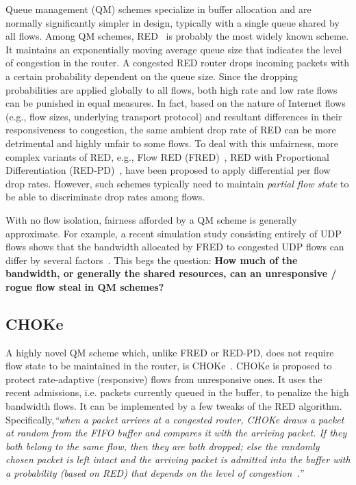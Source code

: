 \documentclass{IEEEtran}
\begin{document}
Queue management (QM) schemes specialize in buffer allocation and are normally significantly simpler in design, typically with a single queue shared by all flows. Among QM schemes, RED~\cite{REDfloyd93,adaptiveRED2001} is probably the most widely known scheme. It maintains an exponentially moving average queue size that indicates the level of congestion in the router. A congested RED router drops incoming packets with a certain probability dependent on the queue size. Since the dropping probabilities are applied globally to all flows, both high rate and low rate flows can be punished in equal measures. In fact, based on the nature of Internet flows (e.g., flow sizes, underlying transport protocol) and resultant differences in their responsiveness to congestion, the same ambient drop rate of RED can be more detrimental and highly unfair to some flows. To deal with this unfairness, more complex variants of RED, e.g.,  Flow RED (FRED)~\cite{fred97}, RED with Proportional Differentiation (RED-PD)~\cite{ratulICNP01}, have been proposed to apply differential per flow drop rates. However, such schemes typically need to maintain \emph{partial flow state} to be able to discriminate drop rates among flows.


With no flow isolation, fairness afforded by a QM scheme is generally approximate. For example, a recent simulation study consisting entirely of UDP flows shows that the bandwidth allocated by FRED to congested UDP flows can differ by several factors~\cite[see Fig.~6]{esheteAFpFT11}. This begs the question: \textbf{How much of the bandwidth, or generally the shared resources, can an unresponsive / rogue flow steal in QM schemes?}


\subsection{CHOKe}\label{subsec:introChoke}

A highly novel QM scheme which, unlike FRED or RED-PD, does not require flow state to be maintained in the router, is CHOKe~\cite{chokeInfocom00}. CHOKe is proposed to protect rate-adaptive (responsive) flows from unresponsive ones. It uses the recent admissions, i.e. packets currently queued in the buffer, to penalize the high bandwidth flows. It can be implemented by a few tweaks of the RED algorithm. Specifically,\emph{``when a packet arrives at a congested router, CHOKe draws a packet at random from the FIFO buffer and compares it with the arriving packet. If they both belong to the same flow, then they are both dropped; else the randomly chosen packet is left intact and the arriving packet is admitted into the buffer with a probability (based on RED) that depends on the level of congestion~\cite{chokeInfocom00}.''}
\end{document}
